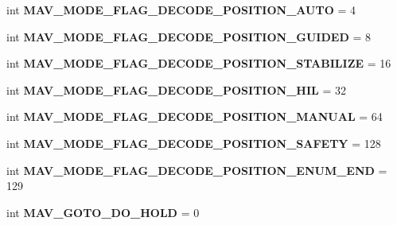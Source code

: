 \begin{DoxyCompactItemize}
int {\bfseries M\+A\+V\+\_\+\+M\+O\+D\+E\+\_\+\+F\+L\+A\+G\+\_\+\+D\+E\+C\+O\+D\+E\+\_\+\+P\+O\+S\+I\+T\+I\+O\+N\+\_\+\+A\+U\+TO} = 4
\item 
\mbox{\label{namespacepymavlink_1_1dialects_1_1v10_aa060e451e34b5c015dcef9f9d0a6056c}} 
int {\bfseries M\+A\+V\+\_\+\+M\+O\+D\+E\+\_\+\+F\+L\+A\+G\+\_\+\+D\+E\+C\+O\+D\+E\+\_\+\+P\+O\+S\+I\+T\+I\+O\+N\+\_\+\+G\+U\+I\+D\+ED} = 8
\item 
\mbox{\label{namespacepymavlink_1_1dialects_1_1v10_aab09da660e1245441e667189357e4b13}} 
int {\bfseries M\+A\+V\+\_\+\+M\+O\+D\+E\+\_\+\+F\+L\+A\+G\+\_\+\+D\+E\+C\+O\+D\+E\+\_\+\+P\+O\+S\+I\+T\+I\+O\+N\+\_\+\+S\+T\+A\+B\+I\+L\+I\+ZE} = 16
\item 
\mbox{\label{namespacepymavlink_1_1dialects_1_1v10_ad668efd84880f6a73f1b9fa9dcc74c75}} 
int {\bfseries M\+A\+V\+\_\+\+M\+O\+D\+E\+\_\+\+F\+L\+A\+G\+\_\+\+D\+E\+C\+O\+D\+E\+\_\+\+P\+O\+S\+I\+T\+I\+O\+N\+\_\+\+H\+IL} = 32
\item 
\mbox{\label{namespacepymavlink_1_1dialects_1_1v10_ad291f47720a46c6b4d83a7be6612d1cd}} 
int {\bfseries M\+A\+V\+\_\+\+M\+O\+D\+E\+\_\+\+F\+L\+A\+G\+\_\+\+D\+E\+C\+O\+D\+E\+\_\+\+P\+O\+S\+I\+T\+I\+O\+N\+\_\+\+M\+A\+N\+U\+AL} = 64
\item 
\mbox{\label{namespacepymavlink_1_1dialects_1_1v10_a2c4c04b88899f5d2bfe631c54bca4e7c}} 
int {\bfseries M\+A\+V\+\_\+\+M\+O\+D\+E\+\_\+\+F\+L\+A\+G\+\_\+\+D\+E\+C\+O\+D\+E\+\_\+\+P\+O\+S\+I\+T\+I\+O\+N\+\_\+\+S\+A\+F\+E\+TY} = 128
\item 
\mbox{\label{namespacepymavlink_1_1dialects_1_1v10_aec3e81b48c65ec5fcd239cba49c40916}} 
int {\bfseries M\+A\+V\+\_\+\+M\+O\+D\+E\+\_\+\+F\+L\+A\+G\+\_\+\+D\+E\+C\+O\+D\+E\+\_\+\+P\+O\+S\+I\+T\+I\+O\+N\+\_\+\+E\+N\+U\+M\+\_\+\+E\+ND} = 129
\item 
\mbox{\label{namespacepymavlink_1_1dialects_1_1v10_aeae1fa6c2621ade2c37603275531b97f}} 
int {\bfseries M\+A\+V\+\_\+\+G\+O\+T\+O\+\_\+\+D\+O\+\_\+\+H\+O\+LD} = 0

\end{DoxyCompactItemize}
